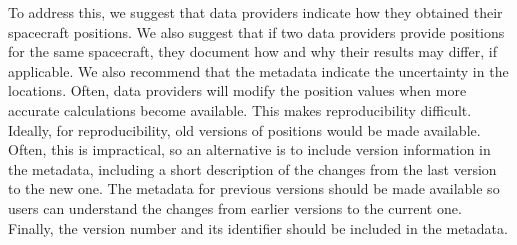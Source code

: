 \documentclass[draft]{agujournal2019}
\begin{document}



To address this, we suggest that data providers indicate how they obtained their spacecraft positions. We also suggest that if two data providers provide positions for the same spacecraft, they document how and why their results may differ, if applicable. We also recommend that the metadata indicate the uncertainty in the locations. Often, data providers will modify the position values when more accurate calculations become available. This makes reproducibility difficult. Ideally, for reproducibility, old versions of positions would be made available. Often, this is impractical, so an alternative is to include version information in the metadata, including a short description of the changes from the last version to the new one. The metadata for previous versions should be made available so users can understand the changes from earlier versions to the current one. Finally, the version number and its identifier should be included in the metadata.
\end{document}
